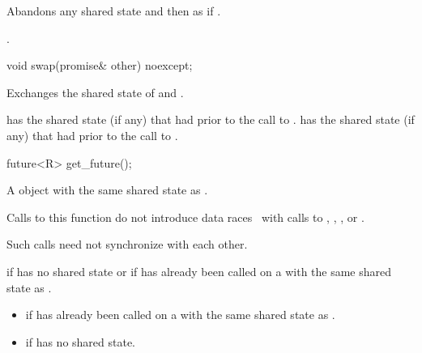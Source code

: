 \begin{itemdescr}
\pnum
\effects
Abandons any shared state and then as if
.

\pnum
\returns
{}.
\end{itemdescr}

%
\begin{itemdecl}
void swap(promise& other) noexcept;
\end{itemdecl}

\begin{itemdescr}
\pnum
\effects
Exchanges the shared state of  and .

\pnum
\ensures
{} has the shared state (if any) that  had
prior to the call to .  has the shared state (if any) that
 had prior to the call to .
\end{itemdescr}

%
\begin{itemdecl}
future<R> get_future();
\end{itemdecl}

\begin{itemdescr}
\pnum
\returns
A  object with the same shared state as
.

\pnum
\sync
Calls to this function do not introduce
data races~ with calls to
,
,
, or
.
\begin{note}
Such calls need not synchronize with each other.
\end{note}

\pnum
\throws
{} if  has no shared state or if
 has already been called on a  with the same
shared state as .

\pnum
\errors

\begin{itemize}
\item {} if  has already been called on
a  with the same shared state as .

\item {} if  has no shared state.
\end{itemize}
\end{itemdescr}

